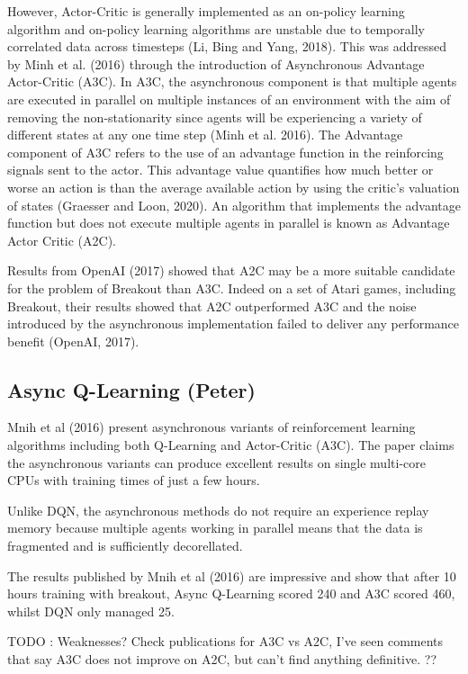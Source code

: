 \documentclass{article}
\begin{document}
\begin{itemize}
However, Actor-Critic is generally implemented as an on-policy learning algorithm and on-policy learning algorithms are unstable due to temporally correlated data across timesteps (Li, Bing and Yang, 2018). This was addressed by Minh et al. (2016) through the introduction of Asynchronous Advantage Actor-Critic (A3C). In A3C, the asynchronous component is that multiple agents are executed in parallel on multiple instances of an environment with the aim of removing the non-stationarity since agents will be experiencing a variety of different states at any one time step (Minh et al. 2016). The Advantage component of A3C refers to the use of an advantage function in the reinforcing signals sent to the actor. This advantage value quantifies how much better or worse an action is than the average available action by using the critic's valuation of states (Graesser and Loon, 2020). An algorithm that implements the advantage function but does not execute multiple agents in parallel is known as Advantage Actor Critic (A2C).

Results from OpenAI (2017) showed that A2C may be a more suitable candidate for the problem of Breakout than A3C. Indeed on a set of Atari games, including Breakout, their results showed that A2C outperformed A3C and the noise introduced by the asynchronous implementation failed to deliver any performance benefit (OpenAI, 2017).

\end{itemize}

\subsection{Async Q-Learning (Peter)}

Mnih et al (2016) present asynchronous variants of reinforcement learning algorithms including both Q-Learning and Actor-Critic (A3C).
The paper claims the asynchronous variants can produce excellent results on single multi-core CPUs with training times of just a few hours.

Unlike DQN, the asynchronous methods do not require an experience replay memory because multiple agents working in parallel means that the data is fragmented and is sufficiently decorellated.

The results published by Mnih et al (2016) are impressive and show that after 10 hours training with breakout, Async Q-Learning scored 240 and A3C scored 460, whilst DQN only managed 25.

TODO : Weaknesses? Check publications for A3C vs A2C, I've seen comments that say A3C does not improve on A2C, but can't find anything definitive. ??
\end{document}
